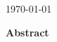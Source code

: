\documentclass[12pt,oneside]{book}
\theoremstyle{plain} %
\theoremstyle{definition}  %
\theoremstyle{remark}  %
\begin{document}
\thispagestyle{empty}


\begin{center}
{\Large \bf \mytitle}

\vspace{.3in}

{\large \myname}

\vspace{.3in}

\today

\end{center}

\vspace{.6in}

\begin{center}
{\large \bf Abstract}
\end{center}
\newpage
\tableofcontents
\end{document}
